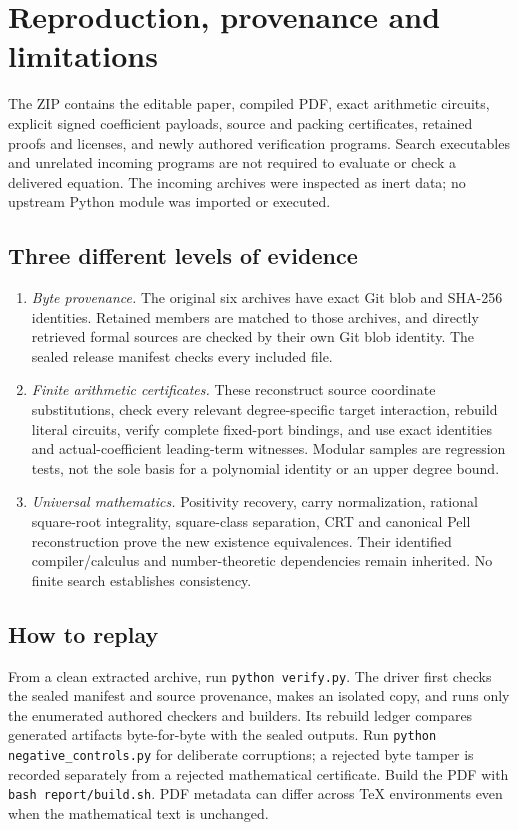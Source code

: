 \section{Reproduction, provenance and limitations}
The ZIP contains the editable paper, compiled PDF, exact arithmetic circuits, explicit signed coefficient payloads, source and packing certificates, retained proofs and licenses, and newly authored verification programs. Search executables and unrelated incoming programs are not required to evaluate or check a delivered equation. The incoming archives were inspected as inert data; no upstream Python module was imported or executed.

\subsection{Three different levels of evidence}
\begin{enumerate}
\item \emph{Byte provenance.} The original six archives have exact Git blob and SHA-256 identities. Retained members are matched to those archives, and directly retrieved formal sources are checked by their own Git blob identity. The sealed release manifest checks every included file.
\item \emph{Finite arithmetic certificates.} These reconstruct source coordinate substitutions, check every relevant degree-specific target interaction, rebuild literal circuits, verify complete fixed-port bindings, and use exact identities and actual-coefficient leading-term witnesses. Modular samples are regression tests, not the sole basis for a polynomial identity or an upper degree bound.
\item \emph{Universal mathematics.} Positivity recovery, carry normalization, rational square-root integrality, square-class separation, CRT and canonical Pell reconstruction prove the new existence equivalences. Their identified compiler/calculus and number-theoretic dependencies remain inherited. No finite search establishes consistency.
\end{enumerate}



\subsection{How to replay}
From a clean extracted archive, run \texttt{python verify.py}. The driver first checks the sealed manifest and source provenance, makes an isolated copy, and runs only the enumerated authored checkers and builders. Its rebuild ledger compares generated artifacts byte-for-byte with the sealed outputs. Run \texttt{python negative\_controls.py} for deliberate corruptions; a rejected byte tamper is recorded separately from a rejected mathematical certificate. Build the PDF with \texttt{bash report/build.sh}. PDF metadata can differ across TeX environments even when the mathematical text is unchanged.

